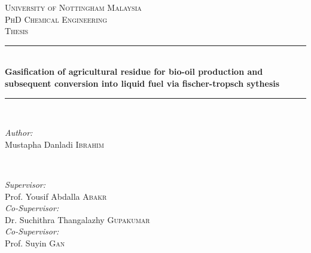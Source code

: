 \begin{titlepage}

\newcommand{\HRule}{\rule{\linewidth}{0.5mm}} %

\center %
 
\textsc{\LARGE University of Nottingham Malaysia}\\[1.5cm] %
\textsc{\Large PhD Chemical Engineering}\\[0.5cm] %
\textsc{\large Thesis }\\[0.5cm] %


\HRule \\[0.4cm]
{ \Large \bfseries Gasification of agricultural residue for bio-oil production and subsequent conversion into liquid fuel via fischer-tropsch sythesis  }\\[0.38cm] %
\HRule \\[1.5cm]

\begin{minipage}{0.4\textwidth}
	\begin{singlespace}
		\begin{flushleft} \large
			\emph{Author:}\\
			Mustapha Danladi \textsc{Ibrahim} %
		\end{flushleft}
	\end{singlespace}

\end{minipage}
~
\begin{minipage}{0.4\textwidth}
	\begin{singlespace}
		\begin{flushright} \large
			\emph{Supervisor:} \\
			Prof. Yousif Abdalla \textsc{Abakr}\\ %
			\bigskip
			\emph{Co-Supervisor:} \\
			Dr. Suchithra Thangalazhy \textsc{Gupakumar}\\
			\bigskip
			\emph{Co-Supervisor:} \\
			Prof. Suyin \textsc{Gan}\\
			\bigskip
		\end{flushright}
	\end{singlespace}
\end{minipage}\\[4cm]




\end{titlepage}
